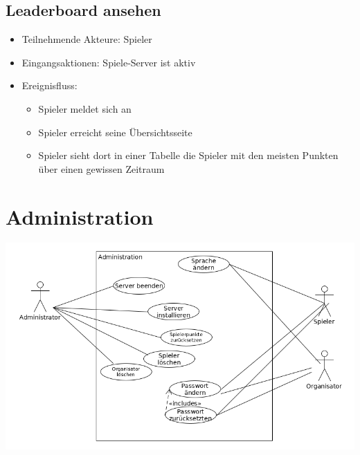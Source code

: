 \documentclass[a4paper]{scrreprt}
\begin{document}
    \subsection{Leaderboard ansehen}
    \begin{itemize}
        \item Teilnehmende Akteure: \Gls{Spieler}
        \item Eingangsaktionen: Spiele-Server ist aktiv
        \item Ereignisfluss:
        \begin{itemize}
            \item Spieler meldet sich an
            \item Spieler erreicht seine Übersichtsseite
            \item Spieler sieht dort in einer Tabelle die Spieler mit den meisten Punkten über einen gewissen Zeitraum
        \end{itemize}
    \end{itemize}
    \newpage
    \section{Administration}
    \includegraphics[width=\textwidth]{uml/export/Administration.png}
\end{document}

